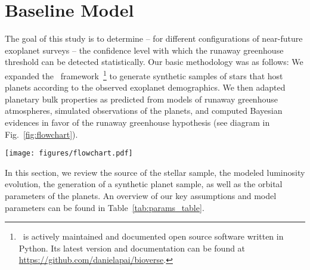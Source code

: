 \documentclass[twocolumn]{aastex631}
\begin{document}
\section{Baseline Model}\label{sec:met_baseline}
The goal of this study is to determine -- for different configurations of near-future exoplanet surveys -- the confidence level with which the runaway greenhouse threshold can be detected statistically. %
Our basic methodology was as follows:
We expanded the \bioverse\ framework~\citep{Bixel2020,Bixel2021}\footnote{\bioverse\ is actively maintained and documented open source software written in Python. Its latest version and documentation can be found at \url{https://github.com/danielapai/bioverse}.} to generate synthetic samples of stars that host planets according to the observed exoplanet demographics.
We then adapted planetary bulk properties as predicted from models of runaway greenhouse atmospheres, simulated observations of the planets, and computed Bayesian evidences in favor of the runaway greenhouse hypothesis (see diagram in Fig.~\ref{fig:flowchart}).
\begin{figure*}
    \begin{centering}
        \texttt{[image: figures/flowchart.pdf]}
        \caption{Workflow of our hypothesis testing with \bioverse. First, we generate a sample of stars and populate them with planets based on \kepler\ demographics.
            A fraction of them are then assigned a runaway greenhouse climate based on the model described in Sect.~\ref{sec:met_rghmodel}.
        We then simulate an exoplanet survey, whereby selection effects and detection biases are introduced. Finally, we test the runaway greenhouse hypothesis based on data from the survey simulation.
        By iterating through these steps, we compute the statistical power of testing the hypothesis for different survey designs.}
        \label{fig:flowchart}
    \end{centering}
\end{figure*}
In this section, we review the source of the stellar sample, the modeled luminosity evolution, the generation of a synthetic planet sample, as well as the orbital parameters of the planets.
An overview of our key assumptions and model parameters can be found in Table~\ref{tab:params_table}.
\end{document}
